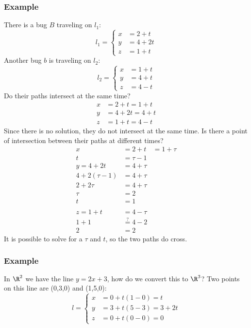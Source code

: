 \documentclass{math}
\begin{document}
\subsubsection*{Example}
There is a bug \( B \) traveling on \( l_1 \):
\[ l_1 = \begin{cases}
  x &= 2+t \\
  y &= 4+2t \\
  z &= 1+t
\end{cases} \]
Another bug \( b \) is traveling on \( l_2 \):
\[ l_2 = \begin{cases}
  x &= 1+t \\
  y &= 4+t \\
  z &= 4-t
\end{cases} \]
Do their paths intersect at the same time?
\begin{align*}
  x &= 2+t = 1+t \\
  y &= 4+2t = 4+t \\
  z &= 1+t = 4-t
\end{align*}
Since there is no solution, they do not intersect at the same time. Is there
a point of intersection between their paths at different times?
\begin{align*}
  x &= 2+t &= 1+\tau \\
  t &= \tau-1 \\
  y = 4+2t &= 4+\tau \\
  4+2(\tau-1) &= 4+\tau \\
  2+2\tau &= 4+\tau \\
  \tau &= 2 \\
  t &= 1 \\ \\
  z = 1+t &= 4-\tau \\
  1+1 &\stackrel{?}{=} 4-2 \\
  2 &= 2
\end{align*}
It is possible to solve for a \( \tau \) and \( t \), so the two paths do cross.

\subsubsection*{Example}
In \( \R^2 \) we have the line \( y=2x+3 \), how do we convert this to
\( \R^3 \)? Two points on this line are (0,3,0) and (1,5,0):
\[ l = \begin{cases}
  x &= 0+t(1-0) = t \\
  y &= 3+t(5-3) = 3+2t \\
  z &= 0+t(0-0) = 0
\end{cases} \]
\end{document}
